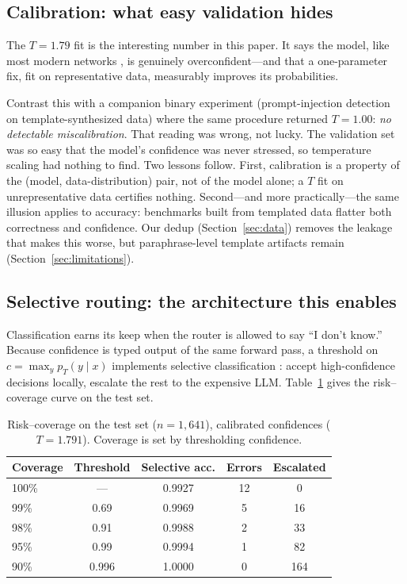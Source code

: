 \documentclass{article}
\begin{document}
\subsection{Calibration: what easy validation hides}
\label{sec:calib-results}

The $T=1.79$ fit is the interesting number in this paper. It says the model,
like most modern networks \citep{guo2017calibration}, is genuinely
overconfident---and that a one-parameter fix, fit on representative data,
measurably improves its probabilities.

Contrast this with a companion binary experiment (prompt-injection detection
on template-synthesized data) where the same procedure returned $T=1.00$:
\emph{no detectable miscalibration}. That reading was wrong, not lucky. The
validation set was so easy that the model's confidence was never stressed,
so temperature scaling had nothing to find. Two lessons follow. First,
calibration is a property of the (model, data-distribution) pair, not of the
model alone; a $T$ fit on unrepresentative data certifies nothing.
Second---and more practically---the same illusion applies to accuracy:
benchmarks built from templated data flatter both correctness and confidence.
Our dedup (Section~\ref{sec:data}) removes the leakage that makes this
worse, but paraphrase-level template artifacts remain (Section~\ref{sec:limitations}).

\subsection{Selective routing: the architecture this enables}
\label{sec:selective}

Classification earns its keep when the router is allowed to say ``I don't
know.'' Because confidence is typed output of the same forward pass, a
threshold on $c = \max_y p_T(y \mid x)$ implements selective classification
\citep{geifman2017selective}: accept high-confidence decisions locally,
escalate the rest to the expensive LLM. Table~\ref{tab:risk-coverage} gives
the risk--coverage curve on the test set.

\begin{table}[t]
  \centering
  \caption{Risk--coverage on the test set ($n=1{,}641$), calibrated
  confidences ($T=1.791$). Coverage is set by thresholding confidence.}
  \label{tab:risk-coverage}
  \begin{tabular}{lcccc}
    \toprule
    Coverage & Threshold & Selective acc. & Errors & Escalated \\
    \midrule
    100\% & --- & 0.9927 & 12 & 0 \\
    99\% & 0.69 & 0.9969 & 5 & 16 \\
    98\% & 0.91 & 0.9988 & 2 & 33 \\
    95\% & 0.99 & 0.9994 & 1 & 82 \\
    90\% & 0.996 & 1.0000 & 0 & 164 \\
    \bottomrule
  \end{tabular}
\end{table}
\end{document}

